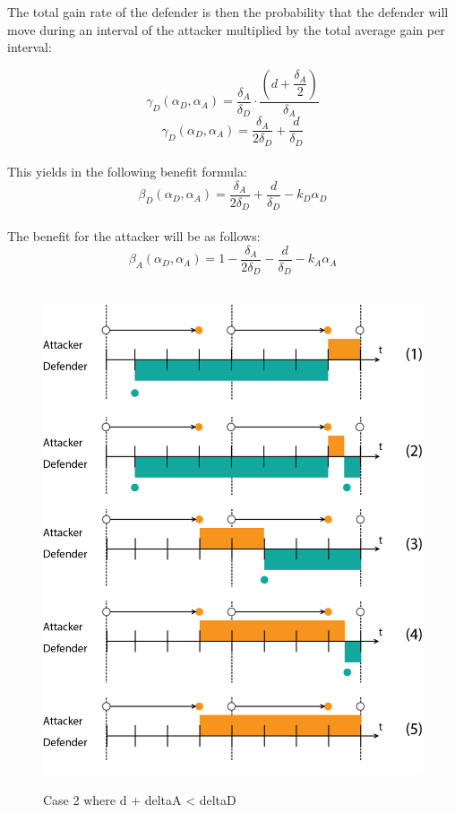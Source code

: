 \documentclass[master=cws, masteroption=vs,english]{kulemt}
\begin{document}
\begin{abstract*}
The total gain  rate of the defender is then the probability that the defender will move during an interval of the attacker multiplied by the total average gain per interval: 

\begin{equation}\label{first}
\gamma_{D}(\alpha_{D},\alpha_{A}) = \dfrac{\delta_{A}}{\delta_{D}} \cdot \dfrac{(d+\dfrac{\delta_{A}}{2})}{\delta_{A}} 
\end{equation}
\begin{equation}\label{first}
\gamma_{D}(\alpha_{D},\alpha_{A}) = \dfrac{\delta_{A}}{2\delta_{D}} + \dfrac{d}{\delta_{D}} 
\end{equation}\\
This yields in the following benefit formula:
\begin{equation}\label{first}
\beta_{D}(\alpha_{D},\alpha_{A}) = \dfrac{\delta_{A}}{2\delta_{D}} + \dfrac{d}{\delta_{D}} - k_{D} \alpha_{D} 
\end{equation}\\

The benefit for the attacker will be as follows:
\begin{equation}\label{first}
\beta_{A}(\alpha_{D},\alpha_{A}) = 1 -\dfrac{\delta_{A}}{2\delta_{D}} - \dfrac{d}{\delta_{D}} - k_{A} \alpha_{A} 
\end{equation}\\

\begin{figure}[hbtp]
\caption{Case 2 where d + deltaA < deltaD}
\centering
\includegraphics[scale=0.5]{../../doc/template/Images/FlipItCase2.png}
\label{fig:case2}
\end{figure}



\end{abstract*}
\end{document}
